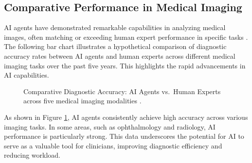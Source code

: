 \documentclass[12pt,a4paper]{article}
\begin{document}
\subsection{Comparative Performance in Medical Imaging}
AI agents have demonstrated remarkable capabilities in analyzing medical images, often matching or exceeding human expert performance in specific tasks \cite{esteva2017dermatologist}. The following bar chart illustrates a hypothetical comparison of diagnostic accuracy rates between AI agents and human experts across different medical imaging tasks over the past five years. This highlights the rapid advancements in AI capabilities.

\begin{figure}[H]
  \centering
  \caption{Comparative Diagnostic Accuracy: AI Agents vs.\ Human Experts across five medical imaging modalities \cite{rajpurkar2017chexnet,mckinney2020international,esteva2017dermatologist}.}
  \label{fig:accuracy_chart}
\end{figure}

As shown in Figure \ref{fig:accuracy_chart}, AI agents consistently achieve high accuracy across various imaging tasks. In some areas, such as ophthalmology and radiology, AI performance is particularly strong. This data underscores the potential for AI to serve as a valuable tool for clinicians, improving diagnostic efficiency and reducing workload.
\end{document}
